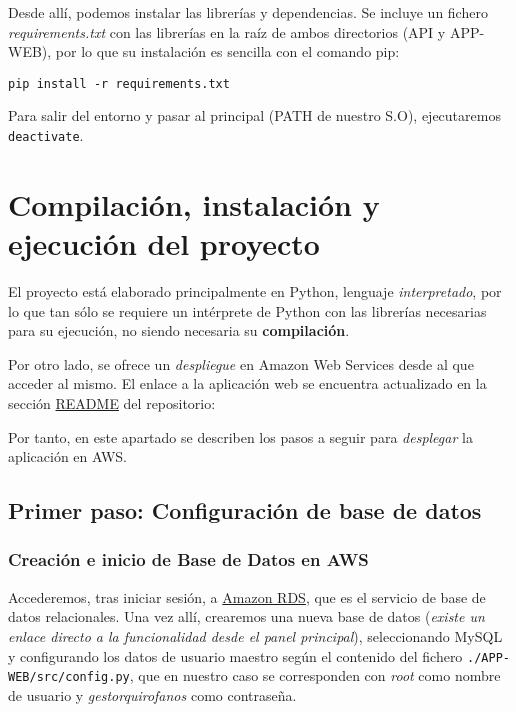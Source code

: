 Desde allí, podemos instalar las librerías y dependencias. Se incluye un fichero \textit{requirements.txt} con las librerías en la raíz de ambos directorios (API y APP-WEB), por lo que su instalación es sencilla con el comando pip:

\texttt{pip install -r requirements.txt}

Para salir del entorno y pasar al principal (PATH de nuestro S.O), ejecutaremos \texttt{deactivate}.


\section{Compilación, instalación y ejecución del proyecto}

El proyecto está elaborado principalmente en Python, lenguaje \textit{interpretado}, por lo que tan sólo se requiere un intérprete de Python con las librerías necesarias para su ejecución, no siendo necesaria su \textbf{compilación}.

Por otro lado, se ofrece un \textit{despliegue} en Amazon Web Services desde al que acceder al mismo. El enlace a la aplicación web se encuentra actualizado en la sección \href{https://github.com/jesgararm/GestorQuirofanos#readme}{README} del repositorio:


Por tanto, en este apartado se describen los pasos a seguir para \textit{desplegar} la aplicación en AWS.

\subsection{Primer paso: Configuración de base de datos}

\subsubsection{Creación e inicio de Base de Datos en AWS}

Accederemos, tras iniciar sesión, a \href{https://aws.amazon.com/es/rds/}{Amazon RDS}, que es el servicio de base de datos relacionales. Una vez allí, crearemos una nueva base de datos (\textit{existe un enlace directo a la funcionalidad desde el panel principal}), seleccionando MySQL y configurando los datos de usuario maestro según el contenido del fichero \texttt{./APP-WEB/src/config.py}, que en nuestro caso se corresponden con \textit{root} como nombre de usuario y \textit{gestorquirofanos} como contraseña.


